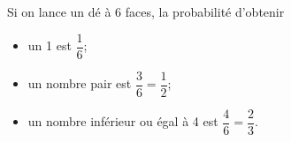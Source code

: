 \documentclass[12pt,a4paper]{article}
\begin{document}
	\begin{myex}
		Si on lance un dé à 6 faces, la probabilité d'obtenir
		\begin{itemize}
			\item un 1 est $\dfrac{1}{6}$;
			\item un nombre pair est $\dfrac{3}{6} = \dfrac{1}{2}$;
			\item un nombre inférieur ou égal à 4 est $\dfrac{4}{6}=\dfrac{2}{3}$.
		\end{itemize}
	\end{myex}

	
\end{document}
